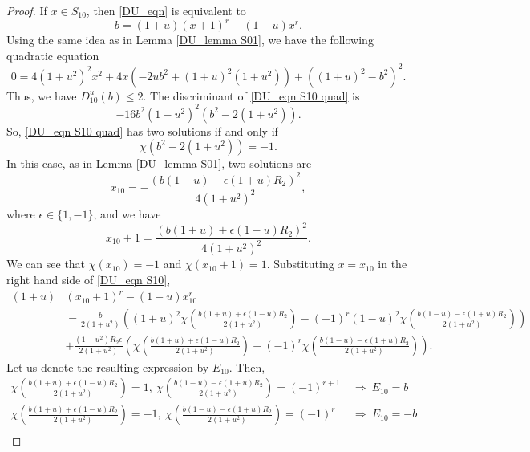 \documentclass[11pt]{article}
\numberwithin{theorem}{section}
\begin{document}
\begin{proof}
If $x\in S_{10}$, then \eqref{DU_eqn} is equivalent to 
\begin{equation}\label{DU_eqn S10}
	b=(1+ u)(x+1)^r- (1-u)x^r .  
\end{equation}
Using the same idea as in Lemma \ref{DU_lemma S01}, we have the following quadratic equation
\begin{equation}\label{DU_eqn S10 quad}
	0=4(1+u^2)^2x^2+4x\left( -2ub^2 +(1+u)^2(1+u^2) \right) +\left(  (1+u)^2 -b^2\right)^2. 
\end{equation}
Thus, we have $D_{10}^u(b) \le 2$. The discriminant of \eqref{DU_eqn S10 quad} is 
\begin{equation*}
	-16b^2(1-u^2)^2\left( b^2-2(1+u^2) \right). 
\end{equation*}
So, \eqref{DU_eqn S10 quad} has two solutions if and only if 
\begin{equation*}
	\chi\left( b^2-2(1+u^2) \right)=-1.
\end{equation*}
In this case, as in Lemma \ref{DU_lemma S01}, two solutions are
\begin{equation*}
	x_{10}= -\frac{\left( b(1-u)-\epsilon (1+u)R_2\right)^2}{4(1+u^2)^2},
\end{equation*}
where $\epsilon\in \{1,-1\}$, and we have
\begin{equation*}
	x_{10}+1 =\frac{\left( b(1+u)+\epsilon(1-u)R_2\right) ^2}{4(1+u^2)^2}.
\end{equation*}
We can see that $\chi(x_{10})=-1$ and $\chi(x_{10}+1)=1$. Substituting $x=x_{10}$ in the right hand side of \eqref{DU_eqn S10},
\begin{align*}
	(1+ u)&(x_{10}+1)^r- (1-u)x_{10}^r \\
	&=\frac{b}{2(1+u^2)}\left(  (1+u)^2\chi\left( \frac{ b(1+u)+\epsilon(1-u)R_2}{2(1+u^2)}\right) -(-1)^r(1-u)^2\chi\left( \frac{ b(1-u)-\epsilon(1+u)R_2}{2(1+u^2)}\right) \right) \\
	&+\frac{(1-u^2)R_2 \epsilon}{2(1+u^2)}\left(  \chi\left( \frac{ b(1+u)+\epsilon(1-u)R_2}{2(1+u^2)}\right) +(-1)^r\chi\left( \frac{ b(1-u)-\epsilon(1+u)R_2}{2(1+u^2)}\right) \right).
\end{align*}
Let us denote the resulting expression by $E_{10}$. Then,
\begin{align*}
	\chi\left( \frac{ b(1+u)+\epsilon(1-u)R_2}{2(1+u^2)}\right)=1, \ \chi\left( \frac{ b(1-u)-\epsilon(1+u)R_2}{2(1+u^2)}\right) = (-1)^{r+1}\ &\Rightarrow\ E_{10}=b\\
	\chi\left( \frac{ b(1+u)+\epsilon(1-u)R_2}{2(1+u^2)}\right)=-1, \ \chi\left( \frac{ b(1-u)-\epsilon(1+u)R_2}{2(1+u^2)}\right) = (-1)^r\  &\Rightarrow\ E_{10}=-b\\

\end{align*}
\end{proof}
\end{document}
